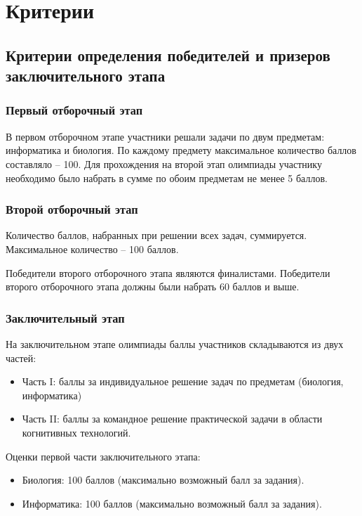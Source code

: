 \part{Критерии}

\chapter{Критерии определения победителей и призеров заключительного этапа}

\section{Первый отборочный этап}

В первом отборочном этапе участники решали задачи по двум предметам: информатика и биология.  По каждому предмету максимальное количество баллов составляло – 100.  Для прохождения на второй этап олимпиады участнику необходимо было набрать в сумме по обоим предметам не менее 5 баллов.

\section{Второй отборочный этап}

Количество баллов, набранных при решении  всех задач, суммируется. Максимальное количество – 100 баллов.

Победители второго отборочного этапа являются финалистами. Победители второго отборочного этапа должны были набрать  60 баллов и выше.

\section{Заключительный этап}

На заключительном этапе олимпиады баллы участников складываются из двух частей:
\begin{itemize} 
\item Часть I:  баллы за индивидуальное решение задач по предметам (биология, информатика)
\item Часть II: баллы за командное решение практической задачи в области когнитивных технологий.
\end{itemize} 

Оценки первой части заключительного этапа:
\begin{itemize} 
\item Биология: 100 баллов (максимально возможный балл за задания).
\item Информатика: 100 баллов (максимально возможный балл за задания).
\end{itemize} 

